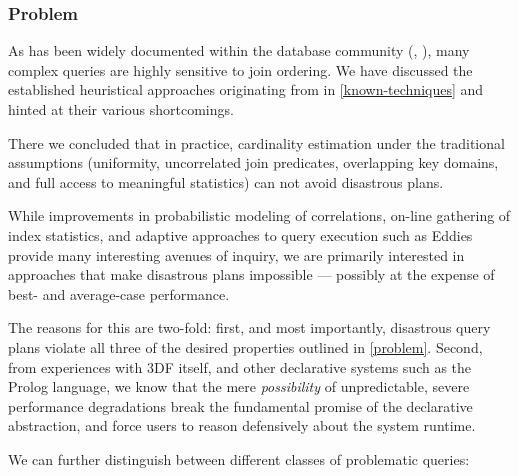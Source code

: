 \documentclass[../catalog.tex]{subfiles}
\begin{document}
\subsubsection{Problem}

As has been widely documented within the database community
(\cite{leis2015good}, \cite{lohman2014query}), many complex queries
are highly sensitive to join ordering. We have discussed the
established heuristical approaches originating from
\cite{selinger1979access} in \autoref{known-techniques} and hinted at
their various shortcomings.

There we concluded that in practice, cardinality estimation under the
traditional assumptions (uniformity, uncorrelated join predicates,
overlapping key domains, and full access to meaningful statistics) can
not avoid disastrous plans.

While improvements in probabilistic modeling of correlations, on-line
gathering of index statistics, and adaptive approaches to query
execution such as Eddies provide many interesting avenues of inquiry,
we are primarily interested in approaches that make disastrous plans
impossible — possibly at the expense of best- and average-case
performance.

The reasons for this are two-fold: first, and most importantly,
disastrous query plans violate all three of the desired properties
outlined in \ref{problem}. Second, from experiences with 3DF itself,
and other declarative systems such as the Prolog language, we know
that the mere \emph{possibility} of unpredictable, severe performance
degradations break the fundamental promise of the declarative
abstraction, and force users to reason defensively about the system
runtime.

We can further distinguish between different classes of problematic
queries:
\end{document}
